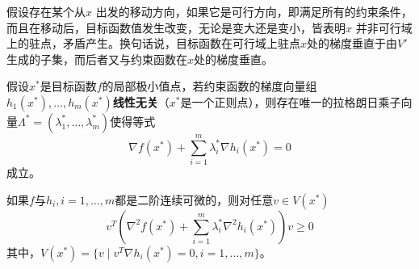 假设存在某个从$x$ 出发的移动方向，如果它是可行方向，即满足所有的约束条件，而且在移动后，目标函数值发生改变，无论是变大还是变小，皆表明$x$ 并非可行域上的驻点，矛盾产生。换句话说，目标函数在可行域上驻点$x$处的梯度垂直于由$V'$生成的子集，而后者又与约束函数在$x$处的梯度垂直。

\begin{theorem}[拉格朗日乘子定理]
假设$x^*$是目标函数$f$的局部极小值点，若约束函数的梯度向量组$h_1(x^*),\ldots, h_m(x^*)$\textbf{线性无关}（$x^*$是一个正则点），则存在唯一的拉格朗日乘子向量$\Lambda^* = (\lambda_1^*,\ldots,\lambda_m^*)$使得等式
\begin{equation}
    \nabla f(x^*) + \sum\limits_{i=1}^m \lambda_i^* \nabla h_i(x^*) =0
\end{equation}
成立。

如果$f$与$h_i,i=1,\ldots,m$都是二阶连续可微的，则对任意$v\in V(x^*)$
\begin{equation}
    v^T (\nabla^2 f(x^*) + \sum\limits_{i=1}^m \lambda_i^* \nabla^2 h_i(x^*)) v \ge 0
\end{equation}
其中，$V(x^*) = \big\{v\mid v^T \nabla h_i(x^*)=0, i = 1,\ldots,m\big\}$。
\end{theorem}

